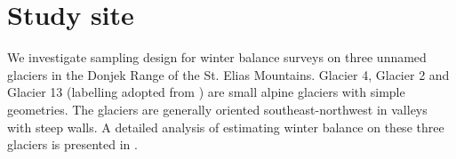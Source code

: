 \documentclass[twocolumn,letterpaper]{igs}
\begin{document}

\section{Study site}

We investigate sampling design for winter balance surveys on three unnamed glaciers in the Donjek Range of the St. Elias Mountains. Glacier 4, Glacier 2 and Glacier 13 (labelling adopted from \cite{Crompton2016}) are small alpine glaciers with simple geometries. The glaciers are generally oriented southeast-northwest in valleys with steep walls. A detailed analysis of estimating winter balance on these three glaciers is presented in \cite{Pulwicki2017}.
\end{document}
